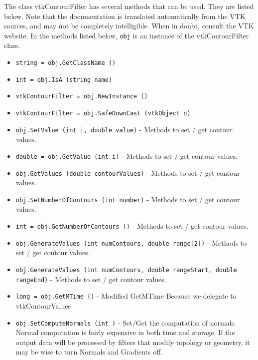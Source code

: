 The class vtkContourFilter has several methods that can be used.
  They are listed below.
Note that the documentation is translated automatically from the VTK sources,
and may not be completely intelligible.  When in doubt, consult the VTK website.
In the methods listed below, \verb|obj| is an instance of the vtkContourFilter class.
\begin{itemize}
\item  \verb|string = obj.GetClassName ()|

\item  \verb|int = obj.IsA (string name)|

\item  \verb|vtkContourFilter = obj.NewInstance ()|

\item  \verb|vtkContourFilter = obj.SafeDownCast (vtkObject o)|

\item  \verb|obj.SetValue (int i, double value)| -  Methods to set / get contour values.

\item  \verb|double = obj.GetValue (int i)| -  Methods to set / get contour values.

\item  \verb|obj.GetValues (double contourValues)| -  Methods to set / get contour values.

\item  \verb|obj.SetNumberOfContours (int number)| -  Methods to set / get contour values.

\item  \verb|int = obj.GetNumberOfContours ()| -  Methods to set / get contour values.

\item  \verb|obj.GenerateValues (int numContours, double range[2])| -  Methods to set / get contour values.

\item  \verb|obj.GenerateValues (int numContours, double rangeStart, double rangeEnd)| -  Methods to set / get contour values.

\item  \verb|long = obj.GetMTime ()| -  Modified GetMTime Because we delegate to vtkContourValues

\item  \verb|obj.SetComputeNormals (int )| -  Set/Get the computation of normals. Normal computation is fairly
 expensive in both time and storage. If the output data will be
 processed by filters that modify topology or geometry, it may be
 wise to turn Normals and Gradients off.


\end{itemize}
